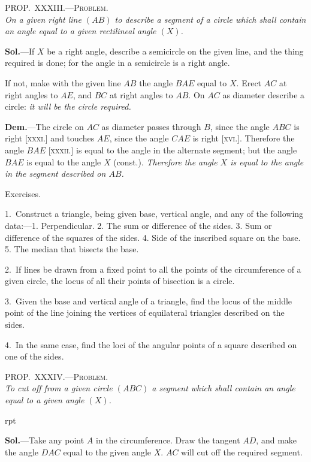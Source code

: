 \documentclass[oneside]{book}
\newcounter{wrapwidth}
\newcommand\myprop[2]{
\bigskip\Needspace*{4\baselineskip}\begin{center}\textsc{#1}\\\medskip\emph{#2}\par\end{center}
}
\newcommand\exhead[1]{
\Needspace*{5\baselineskip}\begin{center}
\textsf{#1}
\end{center}
}
\newcommand\imgflow[3]{
\setcounter{wrapwidth}{#1}

\begin{wrapfigure}[#2]{r}{\value{wrapwidth}pt}
\begin{center}
\vspace{-0.3in}

\end{center}
\end{wrapfigure}
}
\newcommand\imgcent[2]{
\begin{center}

\end{center}
}
\begin{document}
\myprop{PROP\@.~XXXIII\@.---Problem.}{On a given right line $(AB)$ to describe a segment of a
circle which shall contain an angle equal to a given rectilineal
angle $(X)$.}

\textbf{Sol.}---If $X$ be a right angle, describe a semicircle on
the given line, and the thing required is done; for the
angle in a semicircle is a right angle.


\imgcent{290}{f141}

If not, make with the given line $AB$ the angle $BAE$
equal to $X$. Erect $AC$ at right angles to $AE$, and $BC$
at right angles to $AB$. On $AC$ as diameter describe a
circle: \emph{it will be the circle required.}

\textbf{Dem.}---The circle on $AC$ as diameter passes through
$B$, since the angle $ABC$ is right [\textsc{xxxi.}] and touches
$AE$, since the angle $CAE$ is right [\textsc{xvi.}]. Therefore
the angle $BAE$ [\textsc{xxxii.}] is equal to the angle in the
alternate segment; but the angle $BAE$ is equal to the
angle $X$ (const.). \emph{Therefore the angle $X$ is equal to
the angle in the segment described on $AB$.}

\exhead{Exercises.}

\begin{footnotesize}
1.~Construct a triangle, being given base, vertical angle, and
any of the following data:---1. Perpendicular. 2. The sum or
difference of the sides. 3. Sum or difference of the squares of
the sides. 4. Side of the inscribed square on the base. 5. The
median that bisects the base.


2.~If lines be drawn from a fixed point to all the points of the
circumference of a given circle, the locus of all their points of
bisection is a circle.

3.~Given the base and vertical angle of a triangle, find the
locus of the middle point of the line joining the vertices of
equilateral triangles described on the sides.

4.~In the same case, find the loci of the angular points of a
square described on one of the sides.
\par\end{footnotesize}

\myprop{PROP\@.~XXXIV\@.---Problem.}{To cut off from a given circle $(ABC)$ a segment which
shall contain an angle equal to a given angle $(X)$.}


\imgflow{140}{9}{f142}

\textbf{Sol.}---Take any point $A$ in the circumference. Draw
the tangent $AD$, and make the
angle $DAC$ equal to the given
angle $X$. $AC$ will cut off the
required segment.
\end{document}
